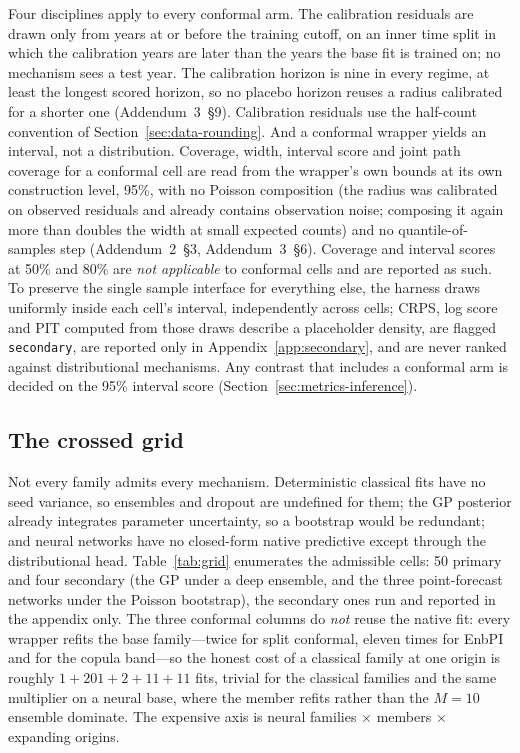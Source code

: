 Four disciplines apply to every conformal arm. The calibration residuals
are drawn only from years at or before the training cutoff, on an inner
time split in which the calibration years are later than the years the
base fit is trained on; no mechanism sees a test year. The calibration
horizon is nine in every regime, at least the longest scored horizon, so no
placebo horizon reuses a radius calibrated for a shorter one
(Addendum~3~\S9). Calibration residuals use the half-count convention of
Section~\ref{sec:data-rounding}. And a conformal wrapper yields an
interval, not a distribution. Coverage, width, interval score and joint
path coverage for a conformal cell are read from the wrapper's own bounds
at its own construction level, 95\%, with no Poisson composition (the
radius was calibrated on observed residuals and already contains
observation noise; composing it again more than doubles the width at
small expected counts) and no quantile-of-samples step (Addendum~2~\S3,
Addendum~3~\S6). Coverage and interval scores at 50\% and 80\% are
\emph{not applicable} to conformal cells and are reported as such. To
preserve the single sample interface for everything else, the harness
draws uniformly inside each cell's interval, independently across cells;
CRPS, log score and PIT computed from those draws describe a placeholder
density, are flagged \texttt{secondary}, are reported only in
Appendix~\ref{app:secondary}, and are never ranked against distributional
mechanisms. Any contrast that includes a conformal arm is decided on the
95\% interval score (Section~\ref{sec:metrics-inference}).

\subsection{The crossed grid}
\label{sec:design-grid}

Not every family admits every mechanism. Deterministic classical fits have
no seed variance, so ensembles and dropout are undefined for them; the GP
posterior already integrates parameter uncertainty, so a bootstrap would be
redundant; and neural networks have no closed-form native predictive except
through the distributional head. Table~\ref{tab:grid} enumerates the
admissible cells: 50 primary and four secondary (the GP under a deep
ensemble, and the three point-forecast networks under the Poisson
bootstrap), the secondary ones run and reported in the appendix only. The
three conformal columns do \emph{not} reuse the native fit: every wrapper
refits the base family---twice for split conformal, eleven times for EnbPI
and for the copula band---so the honest cost of a classical family at one
origin is roughly $1+201+2+11+11$ fits, trivial for the classical families
and the same multiplier on a neural base, where the member refits rather
than the $M=10$ ensemble dominate. The expensive axis is neural families
$\times$ members $\times$ expanding origins.

